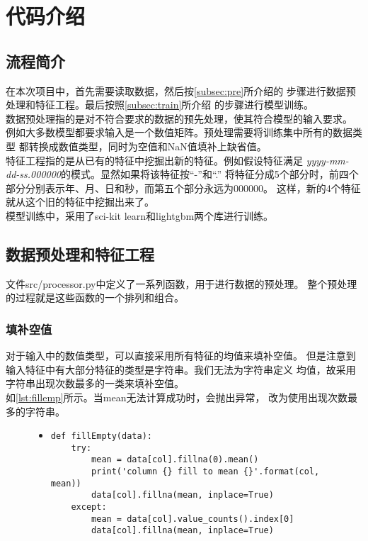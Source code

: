 \documentclass[a4paper]{article}
\begin{document}
\section{代码介绍}
\subsection{流程简介}
在本次项目中，首先需要读取数据，然后按\autoref{subsec:pre}所介绍的
步骤进行数据预处理和特征工程。最后按照\autoref{subsec:train}所介绍
的步骤进行模型训练。\\

数据预处理指的是对不符合要求的数据的预先处理，使其符合模型的输入要求。
例如大多数模型都要求输入是一个数值矩阵。预处理需要将训练集中所有的数据类型
都转换成数值类型，同时为空值和NaN值填补上缺省值。\\

特征工程指的是从已有的特征中挖掘出新的特征。例如假设特征满足
\emph{yyyy-mm-dd-ss.000000}的模式。显然如果将该特征按``-''和``.''
将特征分成5个部分时，前四个部分分别表示年、月、日和秒，而第五个部分永远为000000。
这样，新的4个特征就从这个旧的特征中挖掘出来了。\\

模型训练中，采用了sci-kit learn和lightgbm两个库进行训练。

\subsection{数据预处理和特征工程}\label{subsec:pre}
文件src/processor.py中定义了一系列函数，用于进行数据的预处理。
整个预处理的过程就是这些函数的一个排列和组合。

\subsubsection{填补空值}
对于输入中的数值类型，可以直接采用所有特征的均值来填补空值。
但是注意到输入特征中有大部分特征的类型是字符串。我们无法为字符串定义
均值，故采用字符串出现次数最多的一类来填补空值。\\

如\autoref{lst:fillemp}所示。当mean无法计算成功时，会抛出异常，
改为使用出现次数最多的字符串。
\begin{figure}[!hbt]
\begin{itemize}
\item[] \begin{lstlisting}[style=mypython, label=lst:fillemp, caption=填补空值的过程]
def fillEmpty(data):
    try:
        mean = data[col].fillna(0).mean()
        print('column {} fill to mean {}'.format(col, mean))
        data[col].fillna(mean, inplace=True)
    except:
        mean = data[col].value_counts().index[0]
        data[col].fillna(mean, inplace=True)
\end{lstlisting}
\end{itemize}
\end{figure}
\end{document}
